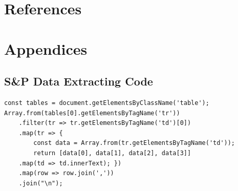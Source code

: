 \documentclass[12pt]{article}
\begin{document}
\newpage

\section{References}

\printbibliography[title={~}]

\section{Appendices}

\subsection{S\&P Data Extracting Code} \label{spcode}

\begin{verbatim}
const tables = document.getElementsByClassName('table');
Array.from(tables[0].getElementsByTagName('tr'))
    .filter(tr => tr.getElementsByTagName('td')[0])
    .map(tr => { 
        const data = Array.from(tr.getElementsByTagName('td')); 
        return [data[0], data[1], data[2], data[3]]
    .map(td => td.innerText); })
    .map(row => row.join(','))
    .join("\n");
\end{verbatim}
\end{document}
